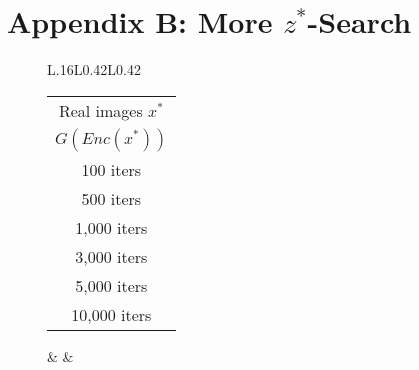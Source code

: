 \documentclass[runningheads]{llncs}
\begin{document}
    \vfill
    
    \clearpage
    
    \section{Appendix B: More $z^*$-Search}
    
    \vfill
    
    \begin{figure}[!h]
        \begin{tabular}{L{.16\linewidth}L{0.42\linewidth}L{0.42\linewidth}}
            \begin{tabular}{c}
                \scriptsize Real images $x^*$ \\ [0.9em]
                \scriptsize $G(Enc(x^*))$ \\ [0.9em]
                \scriptsize 100 iters \\ [0.9em]
                \scriptsize 500 iters \\ [0.9em]
                \scriptsize 1{,}000 iters \\ [0.9em]
                \scriptsize 3{,}000 iters \\ [0.9em]
                \scriptsize 5{,}000 iters \\ [0.9em]
                \scriptsize 10{,}000 iters
                \end{tabular} &
             &
        \end{tabular}
        

\end{figure}
\end{document}
